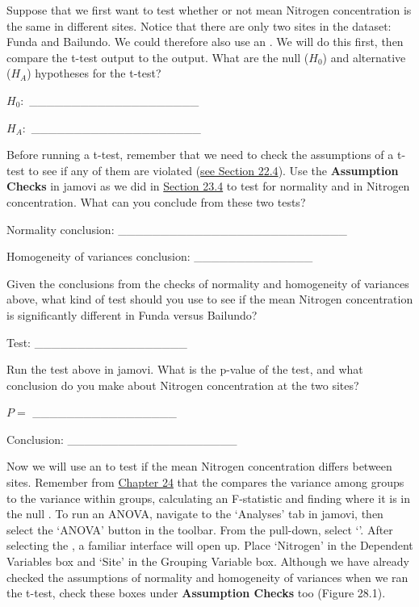 \documentclass[
  openany]{krantz}
\begin{document}
Suppose that we first want to test whether or not mean Nitrogen concentration is the same in different sites.
Notice that there are only two sites in the dataset: Funda and Bailundo.
We could therefore also use an .
We will do this first, then compare the t-test output to the  output.
What are the null (\(H_{0}\)) and alternative (\(H_{A}\)) hypotheses for the t-test?

\(H_{0}:\) \_\_\_\_\_\_\_\_\_\_\_\_\_\_\_\_\_\_\_\_

\(H_{A}:\) \_\_\_\_\_\_\_\_\_\_\_\_\_\_\_\_\_\_\_\_

Before running a t-test, remember that we need to check the assumptions of a t-test to see if any of them are violated (\protect\hyperlink{assumptions-of-t-tests}{see Section 22.4}).
Use the \textbf{Assumption Checks} in jamovi as we did in \protect\hyperlink{independent-samples-t-test-1}{Section 23.4} to test for normality and  in Nitrogen concentration.
What can you conclude from these two tests?

Normality conclusion: \_\_\_\_\_\_\_\_\_\_\_\_\_\_\_\_\_\_\_\_\_\_\_\_\_\_\_

Homogeneity of variances conclusion: \_\_\_\_\_\_\_\_\_\_\_\_\_\_

Given the conclusions from the checks of normality and homogeneity of variances above, what kind of test should you use to see if the mean Nitrogen concentration is significantly different in Funda versus Bailundo?

Test: \_\_\_\_\_\_\_\_\_\_\_\_\_\_\_\_\_\_

Run the test above in jamovi.
What is the p-value of the test, and what conclusion do you make about Nitrogen concentration at the two sites?

\(P =\) \_\_\_\_\_\_\_\_\_\_\_\_\_\_\_\_\_

Conclusion: \_\_\_\_\_\_\_\_\_\_\_\_\_\_\_\_\_\_\_\_

Now we will use an  to test if the mean Nitrogen concentration differs between sites.
Remember from \protect\hyperlink{Chapter_24}{Chapter 24} that the  compares the variance among groups to the variance within groups, calculating an F-statistic and finding where it is in the null .
To run an ANOVA, navigate to the `Analyses' tab in jamovi, then select the `ANOVA' button in the toolbar.
From the  pull-down, select `'.
After selecting the , a familiar interface will open up.
Place `Nitrogen' in the Dependent Variables box and `Site' in the Grouping Variable box.
Although we have already checked the assumptions of normality and homogeneity of variances when we ran the t-test, check these boxes under \textbf{Assumption Checks} too (Figure 28.1).
\end{document}
